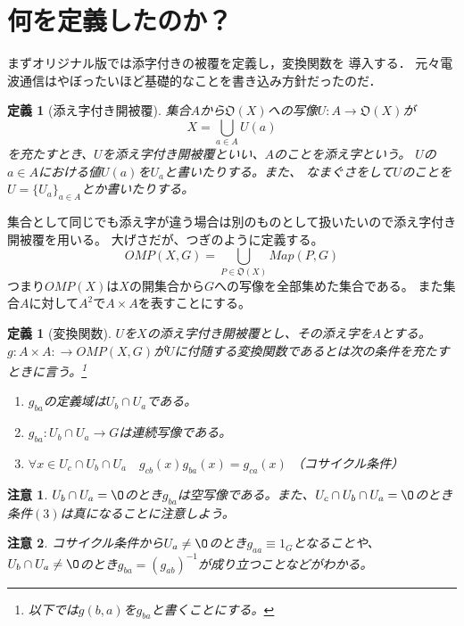 \documentclass[leqno]{jsarticle}
\newtheorem{df}[thm]{定義}
\newtheorem*{cau}{注意}
\begin{document}
\section{何を定義したのか？}
まずオリジナル版では添字付きの被覆を定義し，変換関数を
導入する．
元々電波通信はやぼったいほど基礎的なことを書き込み方針だったのだ．
\begin{df}[添え字付き開被覆]
集合$A$から$\mathfrak{O}(X)$への写像$U:A\to \mathfrak{O}(X)$が
\[
X=\bigcup_{a\in A}U(a)
\]
を充たすとき、$U$を添え字付き開被覆といい、$A$のことを添え字という。
$U$の$a\in A$における値$U(a)$を$U_a$と書いたりする。また、
なまぐさをして$U$のことを$U=\{U_a\}_{a\in A}$とか書いたりする。
\end{df}
集合として同じでも添え字が違う場合は別のものとして扱いたいので添え字付き開被覆を用いる。
大げさだが、つぎのように定義する。
\[
OMP(X,G)=\bigcup_{P\in \mathfrak{O}(X)}Map(P, G)
\]
つまり$OMP(X)$は$X$の開集合から$G$への写像を全部集めた集合である。
また集合$A$に対して$A^2$で$A\times A$を表すことにする。
\begin{df}[変換関数]
$U$を$X$の添え字付き開被覆とし、その添え字を$A$とする。$g:A\times A:\to OMP(X,G)$が$U$に付随する変換関数であるとは次の条件を充たすときに言う。\footnote{以下では$g(b,a)$を$g_{ba}$と書くことにする。}
\begin{enumerate}
\item $g_{ba}$の定義域は$U_{b}\cap U_{a}$である。
\item $g_{ba}: U_b\cap U_a\to G$は連続写像である。
\item $\forall x\in U_c\cap U_b\cap U_a\quad g_{cb}(x)g_{ba}(x)=g_{ca}(x)$ （コサイクル条件）
\end{enumerate}
\end{df}
\begin{cau}
$U_b\cap U_a=\O$のとき$g_{ba}$は空写像である。また、$U_c\cap U_b\cap U_a=\O$のとき条件$(3)$は真になることに注意しよう。
\end{cau}
\begin{cau}
コサイクル条件から$U_a\neq \O$のとき$g_{aa}\equiv 1_G$となることや、
$U_b\cap U_a\neq \O$のとき$g_{ba}=(g_{ab})^{-1}$が成り立つことなどがわかる。
\end{cau}
\end{document}
